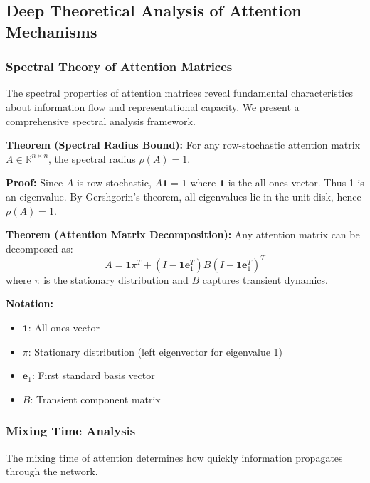 \subsection{Deep Theoretical Analysis of Attention Mechanisms}

\subsubsection{Spectral Theory of Attention Matrices}

The spectral properties of attention matrices reveal fundamental characteristics about information flow and representational capacity. We present a comprehensive spectral analysis framework.

\textbf{Theorem (Spectral Radius Bound):} For any row-stochastic attention matrix $A \in \mathbb{R}^{n \times n}$, the spectral radius $\rho(A) = 1$.

\textbf{Proof:} Since $A$ is row-stochastic, $A\mathbf{1} = \mathbf{1}$ where $\mathbf{1}$ is the all-ones vector. Thus 1 is an eigenvalue. By Gershgorin's theorem, all eigenvalues lie in the unit disk, hence $\rho(A) = 1$.

\textbf{Theorem (Attention Matrix Decomposition):} Any attention matrix can be decomposed as:
\begin{equation}
A = \mathbf{1}\pi^T + (I - \mathbf{1}\mathbf{e}_1^T)B(I - \mathbf{1}\mathbf{e}_1^T)^T
\end{equation}
where $\pi$ is the stationary distribution and $B$ captures transient dynamics.

\begin{notationbox}
\textbf{Notation:}
\begin{itemize}
    \item $\mathbf{1}$: All-ones vector
    \item $\pi$: Stationary distribution (left eigenvector for eigenvalue 1)
    \item $\mathbf{e}_1$: First standard basis vector
    \item $B$: Transient component matrix
\end{itemize}
\end{notationbox}

\subsubsection{Mixing Time Analysis}

The mixing time of attention determines how quickly information propagates through the network.

